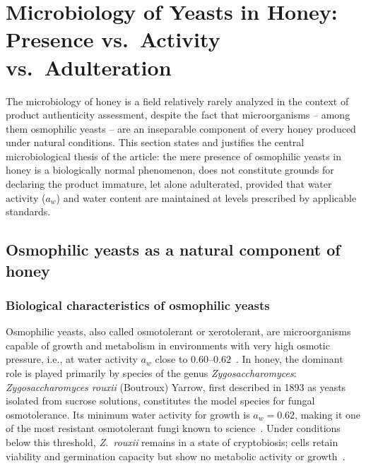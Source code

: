 
\section{Microbiology of Yeasts in Honey:
Presence vs.\ Activity vs.\ Adulteration}

The microbiology of honey is a field relatively rarely analyzed
in the context of product authenticity assessment, despite the fact
that microorganisms -- among them osmophilic yeasts -- are an
inseparable component of every honey produced under natural
conditions. This section states and justifies the central
microbiological thesis of the article: the mere presence of
osmophilic yeasts in honey is a biologically normal phenomenon,
does not constitute grounds for declaring the product immature,
let alone adulterated, provided that water activity ($a_w$) and
water content are maintained at levels prescribed by applicable
standards.

\subsection{Osmophilic yeasts as a natural component of honey}

\subsubsection{Biological characteristics of osmophilic yeasts}

Osmophilic yeasts, also called osmotolerant or xerotolerant, are
microorganisms capable of growth and metabolism in environments
with very high osmotic pressure, i.e., at water activity $a_w$
close to $0.60$--$0.62$~\cite{ruegg1981,waaw2006}. In honey,
the dominant role is played primarily by species of the genus
\textit{Zygosaccharomyces}:
\textit{Zygosaccharomyces rouxii} (Boutroux) Yarrow, first described
in 1893 as yeasts isolated from sucrose solutions, constitutes the
model species for fungal osmotolerance. Its minimum water activity
for growth is $a_w = 0.62$, making it one of the most resistant
osmotolerant fungi known to
science~\cite{waaw2006}. Under conditions below this threshold,
\textit{Z.~rouxii} remains in a state of cryptobiosis; cells
retain viability and germination capacity but show no metabolic
activity or growth~\cite{waaw2006,ruegg1981}.

